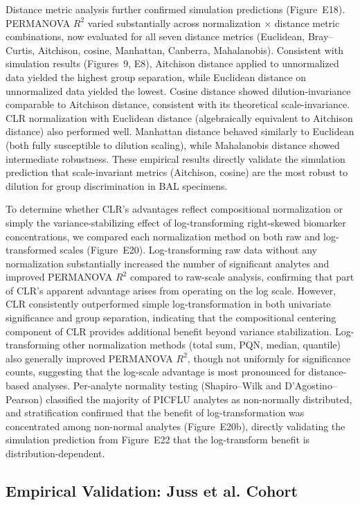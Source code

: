 \documentclass[12pt]{article}
\begin{document}
Distance metric analysis further confirmed simulation predictions (Figure~E18). PERMANOVA $R^2$ varied substantially across normalization $\times$ distance metric combinations, now evaluated for all seven distance metrics (Euclidean, Bray--Curtis, Aitchison, cosine, Manhattan, Canberra, Mahalanobis). Consistent with simulation results (Figures~9, E8), Aitchison distance applied to unnormalized data yielded the highest group separation, while Euclidean distance on unnormalized data yielded the lowest. Cosine distance showed dilution-invariance comparable to Aitchison distance, consistent with its theoretical scale-invariance. CLR normalization with Euclidean distance (algebraically equivalent to Aitchison distance) also performed well. Manhattan distance behaved similarly to Euclidean (both fully susceptible to dilution scaling), while Mahalanobis distance showed intermediate robustness. These empirical results directly validate the simulation prediction that scale-invariant metrics (Aitchison, cosine) are the most robust to dilution for group discrimination in BAL specimens.

To determine whether CLR's advantages reflect compositional normalization or simply the variance-stabilizing effect of log-transforming right-skewed biomarker concentrations, we compared each normalization method on both raw and log-transformed scales (Figure~E20). Log-transforming raw data without any normalization substantially increased the number of significant analytes and improved PERMANOVA $R^2$ compared to raw-scale analysis, confirming that part of CLR's apparent advantage arises from operating on the log scale. However, CLR consistently outperformed simple log-transformation in both univariate significance and group separation, indicating that the compositional centering component of CLR provides additional benefit beyond variance stabilization. Log-transforming other normalization methods (total sum, PQN, median, quantile) also generally improved PERMANOVA $R^2$, though not uniformly for significance counts, suggesting that the log-scale advantage is most pronounced for distance-based analyses. Per-analyte normality testing (Shapiro--Wilk and D'Agostino--Pearson) classified the majority of PICFLU analytes as non-normally distributed, and stratification confirmed that the benefit of log-transformation was concentrated among non-normal analytes (Figure~E20b), directly validating the simulation prediction from Figure~E22 that the log-transform benefit is distribution-dependent.

\subsection{Empirical Validation: Juss et al. Cohort}
\end{document}
